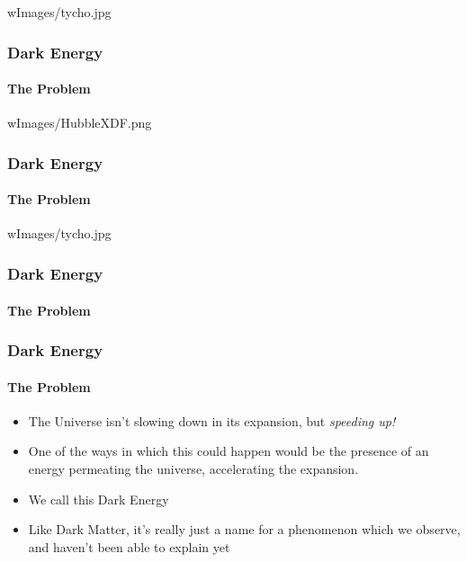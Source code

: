 \begin{frameb}{w}{Images/tycho.jpg}
	\frametitle{Dark Energy}
	\framesubtitle{The Problem}
\end{frameb}

\begin{frameb}{w}{Images/HubbleXDF.png}
	\frametitle{Dark Energy}
	\framesubtitle{The Problem}
\end{frameb}

\begin{frameb}{w}{Images/tycho.jpg}
	\frametitle{Dark Energy}
	\framesubtitle{The Problem}
\end{frameb}

\begin{frame}
	\frametitle{Dark Energy}
	\framesubtitle{The Problem}
	\begin{itemize}
		\item The Universe isn't slowing down in its expansion, but {\em speeding up!}
		\pause\item One of the ways in which this could happen would be the presence of an energy permeating the universe, accelerating the expansion.
		\pause\item We call this Dark Energy
		\pause\item Like Dark Matter, it's really just a name for a phenomenon which we observe, and haven't been able to explain yet
	\end{itemize}
\end{frame}
